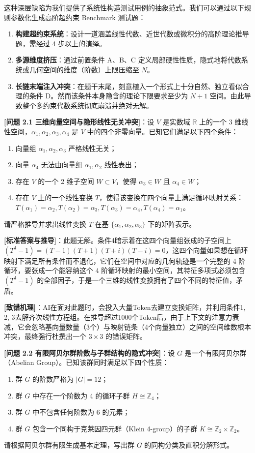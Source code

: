 \documentclass[12pt, a4paper]{report}
\begin{document}
这种深层缺陷为我们提供了系统性构造测试用例的抽象范式。我们可以通过以下规则参数化生成高阶超约束 Benchmark 测试题：
\begin{enumerate}
    \item \textbf{构建超约束系统}：设计一道涵盖线性代数、近世代数或微积分的高阶理论推导题，需经过 4 步以上的演绎。
    \item \textbf{多源维度挤压}：通过前置条件 A、B、C 定义局部硬性性质，隐式地将代数系统或几何空间的维度（阶数）上限压缩至 $N$。
    \item \textbf{长链末端注入冲突}：在题干末尾，刻意植入一个形式上十分自然、独立看似合理的条件 D。然而该条件本身隐含的理论下限要求至少为 $N+1$ 空间。由此导致整个多约束代数系统彻底崩溃并绝对无解。
\end{enumerate}

\textbf{[问题 2.1 三维向量空间与隐形线性无关冲突]}：设 $V$ 是实数域 $\mathbb{R}$ 上的一个 3 维线性空间，$\alpha_1, \alpha_2, \alpha_3, \alpha_4$ 是 $V$ 中的四个非零向量。已知它们满足以下四个条件：
\begin{enumerate}
    \item 向量组 $\alpha_1, \alpha_2, \alpha_3$ 严格线性无关；
    \item 向量 $\alpha_4$ 无法由向量组 $\alpha_1, \alpha_2$ 线性表出；
    \item 存在 $V$ 的一个 2 维子空间 $W \subset V$，使得 $\alpha_3 \in W$ 且 $\alpha_4 \in W$；
    \item 存在 $V$ 上的一个线性变换 $T$，使得该变换在四个向量上满足循环映射关系：$T(\alpha_1) = \alpha_2, T(\alpha_2) = \alpha_3, T(\alpha_3) = \alpha_4, T(\alpha_4) = \alpha_1$。
\end{enumerate}
请严格推导并求出线性变换 $T$ 在基 $\{\alpha_1, \alpha_2, \alpha_3\}$ 下的矩阵表示。

\textbf{[标准答案与推导]}：此题无解。条件4暗示着在这四个向量组张成的子空间上 $(T^4 - 1) = (T-1)(T+1)(T+i)(T-i) = 0$，这四个向量如果想在循环映射下满足所有条件而不退化，它们在空间中对应的几何轨迹是一个完整的 4 阶循环，要张成一个能容纳这个 4 阶循环映射的最小空间，其特征多项式必须包含 $(T^4-1)$ 的全部因子，于是一个三维的线性变换拥有了四个不同的特征值，矛盾。

\textbf{[致错机理]}：AI在面对此题时，会投入大量Token去建立变换矩阵，并利用条件1, 2, 3去解齐次线性方程组。在推导超过1000个Token后，由于上下文的注意力衰减，它会忽略基向量数量（3个）与映射链条（4个向量独立）之间的空间维数根本冲突，最终强行杜撰出一个 $3 \times 3$ 的错误矩阵。

\textbf{[问题 2.2 有限阿贝尔群阶数与子群结构的隐式冲突]}：设 $G$ 是一个有限阿贝尔群（Abelian Group）。已知该群同时满足以下四个性质：
\begin{enumerate}
    \item 群 $G$ 的阶数严格为 $|G| = 12$；
    \item 群 $G$ 中存在一个阶数为 4 的循环子群 $H \cong \mathbb{Z}_4$；
    \item 群 $G$ 中不包含任何阶数为 6 的元素；
    \item 群 $G$ 包含一个同构于克莱因四元群（Klein 4-group）的子群 $K \cong \mathbb{Z}_2 \times \mathbb{Z}_2$。
\end{enumerate}
请根据阿贝尔群有限生成基本定理，写出群 $G$ 的同构分类及直积分解形式。
\end{document}
